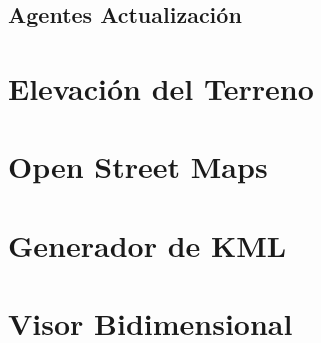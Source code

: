 \subsection*{Agentes Actualización}

\section*{Elevación del Terreno}

\section*{Open Street Maps}

\section*{Generador de KML}

\section*{Visor Bidimensional}